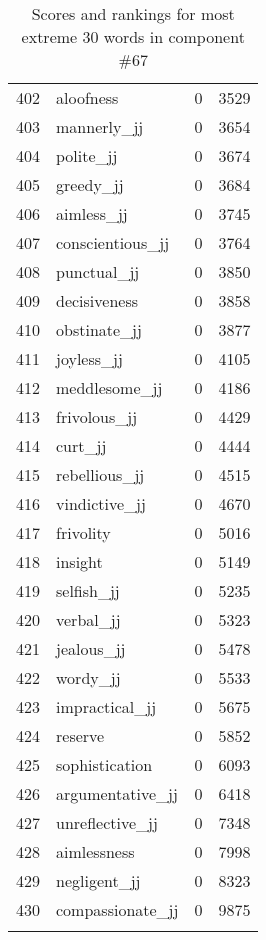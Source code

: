 \begin{longtable}[!htbp]{| rlr@{.}l |}
    402 & aloofness & 0 & 3529 \\
    403 & mannerly\_jj & 0 & 3654 \\
    404 & polite\_jj & 0 & 3674 \\
    405 & greedy\_jj & 0 & 3684 \\
    406 & aimless\_jj & 0 & 3745 \\
    407 & conscientious\_jj & 0 & 3764 \\
    408 & punctual\_jj & 0 & 3850 \\
    409 & decisiveness & 0 & 3858 \\
    410 & obstinate\_jj & 0 & 3877 \\
    411 & joyless\_jj & 0 & 4105 \\
    412 & meddlesome\_jj & 0 & 4186 \\
    413 & frivolous\_jj & 0 & 4429 \\
    414 & curt\_jj & 0 & 4444 \\
    415 & rebellious\_jj & 0 & 4515 \\
    416 & vindictive\_jj & 0 & 4670 \\
    417 & frivolity & 0 & 5016 \\
    418 & insight & 0 & 5149 \\
    419 & selfish\_jj & 0 & 5235 \\
    420 & verbal\_jj & 0 & 5323 \\
    421 & jealous\_jj & 0 & 5478 \\
    422 & wordy\_jj & 0 & 5533 \\
    423 & impractical\_jj & 0 & 5675 \\
    424 & reserve & 0 & 5852 \\
    425 & sophistication & 0 & 6093 \\
    426 & argumentative\_jj & 0 & 6418 \\
    427 & unreflective\_jj & 0 & 7348 \\
    428 & aimlessness & 0 & 7998 \\
    429 & negligent\_jj & 0 & 8323 \\
    430 & compassionate\_jj & 0 & 9875 \\
    \hline
    \caption{Scores and rankings for most extreme 30 words in component \#67} \\
\end{longtable}
